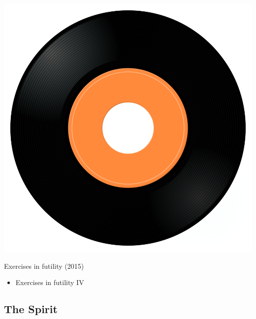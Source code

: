 \begin{minipage}[t]{0.25\textwidth}
\captionsetup{type=figure}
\includegraphics[width=\textwidth]{Images/cover.png}
\caption*{Exercises in futility (2015)}
\end{minipage}
\begin{minipage}[t]{0.25\textwidth}\vspace{0pt}
\begin{itemize}[nosep,leftmargin=1em,labelwidth=*,align=left]
	\setlength{\itemsep}{0pt}
	\item Exercises in futility IV
\end{itemize}
\end{minipage}

\subsection{The Spirit}

